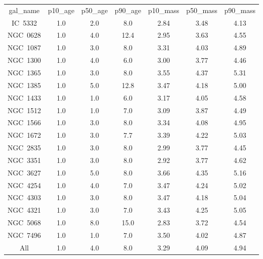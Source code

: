 \begin{table}
\begin{tabular}{ccccccc}
gal_name & p10_age & p50_age & p90_age & p10_mass & p50_mass & p90_mass \\
IC~5332 & 1.0 & 2.0 & 8.0 & 2.84 & 3.48 & 4.13 \\
NGC~0628 & 1.0 & 4.0 & 12.4 & 2.95 & 3.63 & 4.55 \\
NGC~1087 & 1.0 & 3.0 & 8.0 & 3.31 & 4.03 & 4.89 \\
NGC~1300 & 1.0 & 4.0 & 6.0 & 3.00 & 3.77 & 4.46 \\
NGC~1365 & 1.0 & 3.0 & 8.0 & 3.55 & 4.37 & 5.31 \\
NGC~1385 & 1.0 & 5.0 & 12.8 & 3.47 & 4.18 & 5.00 \\
NGC~1433 & 1.0 & 1.0 & 6.0 & 3.17 & 4.05 & 4.58 \\
NGC~1512 & 1.0 & 1.0 & 7.0 & 3.09 & 3.87 & 4.49 \\
NGC~1566 & 1.0 & 3.0 & 8.0 & 3.34 & 4.08 & 4.95 \\
NGC~1672 & 1.0 & 3.0 & 7.7 & 3.39 & 4.22 & 5.03 \\
NGC~2835 & 1.0 & 3.0 & 8.0 & 2.99 & 3.77 & 4.45 \\
NGC~3351 & 1.0 & 3.0 & 8.0 & 2.92 & 3.77 & 4.62 \\
NGC~3627 & 1.0 & 5.0 & 8.0 & 3.66 & 4.35 & 5.16 \\
NGC~4254 & 1.0 & 4.0 & 7.0 & 3.47 & 4.24 & 5.02 \\
NGC~4303 & 1.0 & 3.0 & 8.0 & 3.47 & 4.18 & 5.04 \\
NGC~4321 & 1.0 & 3.0 & 7.0 & 3.43 & 4.25 & 5.05 \\
NGC~5068 & 1.0 & 8.0 & 15.0 & 2.83 & 3.72 & 4.54 \\
NGC~7496 & 1.0 & 1.0 & 7.0 & 3.50 & 4.02 & 4.87 \\
All & 1.0 & 4.0 & 8.0 & 3.29 & 4.09 & 4.94 \\
\end{tabular}
\end{table}
